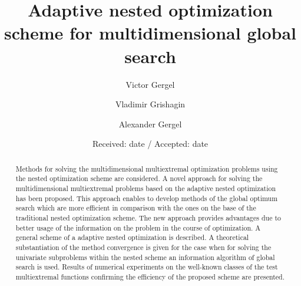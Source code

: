 \documentclass[smallextended]{svjour3}
\begin{document}
\title{Adaptive nested optimization scheme for multidimensional global search}

\author{Victor Gergel       \and
        Vladimir Grishagin  \and
        Alexander Gergel
}



\date{Received: date / Accepted: date}


\maketitle

\begin{abstract}
Methods for solving the multidimensional multiextremal optimization problems using the nested optimization scheme are considered. A novel approach for solving the multidimensional multiextremal problems based on the adaptive nested optimization has been proposed. This approach enables to develop methods of the global optimum search which are more efficient in comparison with the ones on the base of the traditional nested optimization scheme. The new approach provides advantages due to better usage of the information on the problem in the course of optimization. A general scheme of a adaptive nested optimization is described. A theoretical substantiation of the method convergence is given for the case when for solving the univariate subproblems within the nested scheme an information algorithm of global search is used. Results of numerical experiments on the well-known classes of the test multiextremal functions confirming the efficiency of the proposed scheme are presented.

\end{abstract}
\end{document}
